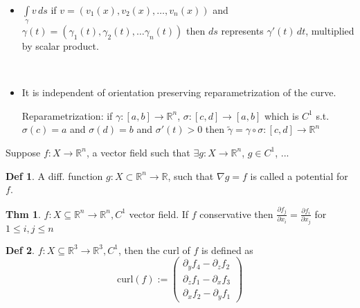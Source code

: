 \documentclass[a4paper, 10pt]{article}
\theoremstyle{definition}
\newtheorem*{theorem}{Thm}
\newtheorem*{definition}{Def}
\newcommand{\R}{\mathbb{R}}
\begin{document}
\begin{note*} \ \\
    \begin{itemize}
        \item \(\int\limits_\gamma v \,ds\) if \(v = (v_1(x), v_2(x), \ldots, v_n(x))\) and \(\gamma(t) = (\gamma_1(t), \gamma_2(t), \ldots \gamma_n(t))\) then \(ds\) represents \(\gamma'(t) \,dt\), multiplied by scalar product.
    \end{itemize}
\end{note*}

\begin{ntheorem*} \ \\
    \begin{itemize}
        \item It is independent of orientation preserving reparametrization of the curve.
        
        Reparametrization: if \(\gamma: [a, b] \to \R^n\), \(\sigma: [c, d] \to [a, b]\) which is \(C^1\) s.t. \(\sigma(c) = a\) and \(\sigma(d) = b\) and \(\sigma'(t) > 0\) then \(\tilde{\gamma} = \gamma \circ \sigma: [c, d] \to \R^n\)
    \end{itemize}
\end{ntheorem*}

Suppose \(f: X \to \R^n\), a vector field such that \(\exists g: X \to \R^n\), \(g \in C^1\), ...

\begin{definition}
    A diff. function \(g: X \subset \R^n \to \R\), such that \(\nabla g = f\) is called a potential for \(f\).
\end{definition}

\begin{theorem}
    \(f: X \subseteq \R^n \to \R^n, C^1\) vector field. If \(f\) conservative then \(\frac{\partial f_j}{\partial x_i} = \frac{\partial f_i}{\partial x_j}\) for \(1 \leq i, j \leq n\)
\end{theorem}

\begin{definition}
    \(f: X \subseteq \R^3 \to \R^3, C^1\), then the curl of \(f\) is defined as
    \[\text{curl}(f) := \begin{pmatrix}
        \partial_y f_4 - \partial_z f_2 \\
        \partial_z f_1 - \partial_x f_3 \\
        \partial_x f_2 - \partial_y f_1
    \end{pmatrix}\]
\end{definition}
\end{document}
